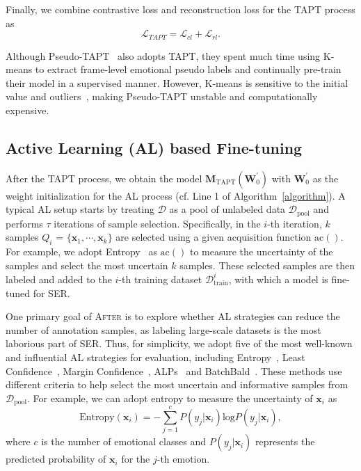 \documentclass{article}
\begin{document}
Finally, we combine contrastive loss and reconstruction loss for the TAPT process as
\begin{equation}
    \mathcal{L}_{TAPT} = \mathcal{L}_{cl} + \mathcal{L}_{rl}.
\end{equation}
 
%
Although Pseudo-TAPT~\cite{2110-06309} also adopts TAPT, they spent much time using K-means to extract frame-level emotional pseudo labels and continually pre-train their model in a supervised manner. However, K-means is sensitive to the initial value and outliers~\cite{ZhangHJQAH20}, making Pseudo-TAPT unstable and computationally expensive.


\subsection{Active Learning (AL) based Fine-tuning}

After the TAPT process, we obtain the model $\mathbf{M}_{\textrm{TAPT}}(\mathbf{W}_{0}^{'})$ with $\mathbf{W}_{0}^{'}$ as the weight initialization for the AL process (cf. Line 1 of Algorithm~\ref{algorithm}). 
%
A typical AL setup starts by treating $\mathcal{D}$ as a pool of unlabeled data $\mathcal{D}_{\textrm{pool}}$ and performs $\tau$ iterations of sample selection. 
%
Specifically, in the $i$-th iteration, $k$ samples
$Q_{i}$ = $\{\mathbf{x}_{1},\cdots,\mathbf{x}_{k}\}$ are selected using a given acquisition function $ \mbox{ac}()$.
For example, we adopt Entropy~\cite{roy2001toward} as $\mbox{ac}()$ to measure the uncertainty of the samples and select the most uncertain $k$ samples. These selected samples are then labeled and added to the $i$-th training dataset $\mathcal{D}^{i}_{\textrm{train}}$, with which a model is fine-tuned for SER.

%
One primary goal of \textsc{After} is to explore whether AL strategies can reduce the number of annotation samples, as labeling large-scale datasets is the most laborious part of SER. Thus, for simplicity, we adopt five of the most well-known and influential AL strategies for evaluation,  including Entropy~\cite{roy2001toward}, Least Confidence~\cite{DredzeC08}, Margin Confidence~\cite{DredzeC08}, ALPs~\cite{YuanLB20} and BatchBald~\cite{KirschAG19}. These methods use different criteria to help select the most uncertain and informative samples from $\mathcal{D}_{\textrm{pool}}$. For example, we can adopt entropy to measure the uncertainty of $\mathbf{x}_{i}$ as \begin{equation} \textrm{Entropy}(\mathbf{x}_{i}) = -\sum_{j=1}^{c}P(y_{j}|\mathbf{x}_{i})\textrm{log}P(y_{j}|\mathbf{x}_{i}), \end{equation} where $c$ is the number of emotional classes and $P(y_{j}|\mathbf{x}_{i})$ represents the predicted probability of $\mathbf{x}_{i}$ for the $j$-th emotion.
\end{document}
